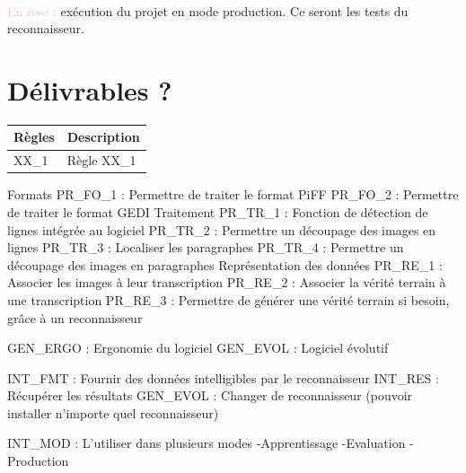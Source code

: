 \paragraph{}
\textcolor{pink}{En rose : } exécution du projet en mode production. Ce seront les tests du reconnaisseur.



\section{Délivrables ?}

\begin{mdframed}[frametitle={Figure N : LOT 1 - X}, innerbottommargin=10]
\begin{center}
\begin{tabular}{ | l | l | }
\hline
{\textbf{Règles}}   &   {\textbf{Description}} \\ \hline
{XX\_1}              &   {Règle XX\_1} \\ \hline
\end{tabular}
\end{center}
\end{mdframed}

Formats
PR\_FO\_1 : Permettre de traiter le format PiFF
PR\_FO\_2 : Permettre de traiter le format GEDI
Traitement
PR\_TR\_1 : Fonction de détection de lignes intégrée au logiciel
PR\_TR\_2 : Permettre un découpage des images en lignes
PR\_TR\_3 : Localiser les paragraphes
PR\_TR\_4 : Permettre un découpage des images en paragraphes
Représentation des données
PR\_RE\_1 : Associer les images à leur transcription
PR\_RE\_2 : Associer la vérité terrain à une transcription
PR\_RE\_3 : Permettre de générer une vérité terrain si besoin, grâce à un reconnaisseur

GEN\_ERGO : Ergonomie du logiciel
GEN\_EVOL : Logiciel évolutif

INT\_FMT : Fournir des données intelligibles par le reconnaisseur
INT\_RES : Récupérer les résultats
GEN\_EVOL : Changer de reconnaisseur (pouvoir installer n’importe quel reconnaisseur)

INT\_MOD : L’utiliser dans plusieurs modes
-Apprentissage
-Evaluation
-Production
